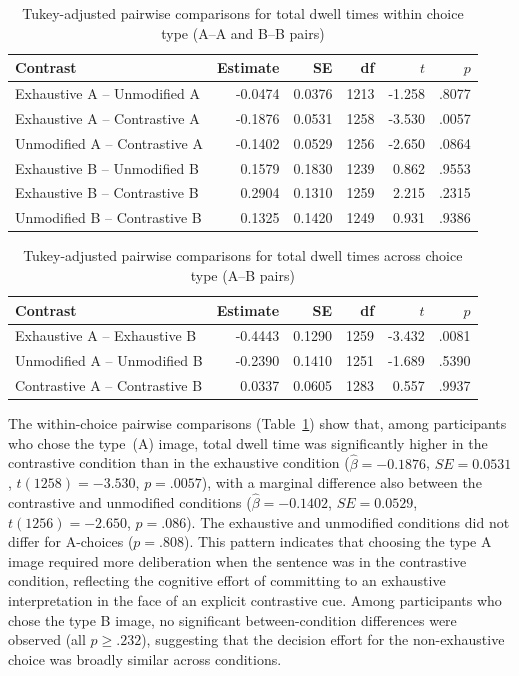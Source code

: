 \documentclass[a4paper, ruler]{CUP-JNL-LIN}%
\begin{document}
\begin{table}[htbp]
\centering
\caption{Tukey-adjusted pairwise comparisons for total dwell times within choice type (A--A and B--B pairs)}
\label{tab:total-dwell-pairwise-within-choice}
\begin{tabularx}{\textwidth}{@{}Xrrrrr@{}}
\toprule
Contrast & Estimate & SE & df & $t$ & $p$ \\
\midrule
Exhaustive A -- Unmodified A   & -0.0474 & 0.0376 & 1213 & -1.258 & .8077 \\
Exhaustive A -- Contrastive A  & -0.1876 & 0.0531 & 1258 & -3.530 & .0057 \\
Unmodified A -- Contrastive A  & -0.1402 & 0.0529 & 1256 & -2.650 & .0864 \\
Exhaustive B -- Unmodified B   &  0.1579 & 0.1830 & 1239 &  0.862 & .9553 \\
Exhaustive B -- Contrastive B  &  0.2904 & 0.1310 & 1259 &  2.215 & .2315 \\
Unmodified B -- Contrastive B  &  0.1325 & 0.1420 & 1249 &  0.931 & .9386 \\
\bottomrule
\end{tabularx}
\end{table}

\begin{table}[htbp]
\centering
\caption{Tukey-adjusted pairwise comparisons for total dwell times across choice type (A--B pairs)}
\label{tab:total-dwell-pairwise-across-choice}
\begin{tabularx}{\textwidth}{@{}Xrrrrr@{}}
\toprule
Contrast & Estimate & SE & df & $t$ & $p$ \\
\midrule
Exhaustive A -- Exhaustive B   & -0.4443 & 0.1290 & 1259 & -3.432 & .0081 \\
Unmodified A -- Unmodified B   & -0.2390 & 0.1410 & 1251 & -1.689 & .5390 \\
Contrastive A -- Contrastive B &  0.0337 & 0.0605 & 1283 &  0.557 & .9937 \\
\bottomrule
\end{tabularx}
\end{table}

The within-choice pairwise comparisons (Table~\ref{tab:total-dwell-pairwise-within-choice}) show that, among participants who chose the type~(A) image, total dwell time was significantly higher in the contrastive condition than in the exhaustive condition ($\hat\beta = -0.1876$, $SE = 0.0531$, $t(1258) = -3.530$, $p = .0057$), with a marginal difference also between the contrastive and unmodified conditions ($\hat\beta = -0.1402$, $SE = 0.0529$, $t(1256) = -2.650$, $p = .086$). The exhaustive and unmodified conditions did not differ for A-choices ($p = .808$). This pattern indicates that choosing the type A image required more deliberation when the sentence was in the contrastive condition, reflecting the cognitive effort of committing to an exhaustive interpretation in the face of an explicit contrastive cue. Among participants who chose the type B image, no significant between-condition differences were observed (all $p \ge .232$), suggesting that the decision effort for the non-exhaustive choice was broadly similar across conditions.
\end{document}
